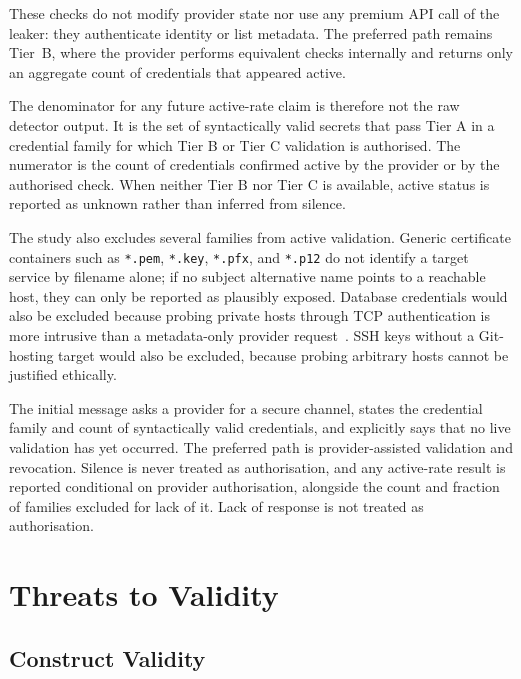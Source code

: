 These checks do not modify provider state nor use any premium API call of the leaker: they authenticate identity or list metadata.
The preferred path remains Tier~B, where the provider performs equivalent checks internally and returns only an aggregate count of credentials that appeared active.

The denominator for any future active-rate claim is therefore not the raw detector output.
It is the set of syntactically valid secrets that pass Tier A in a credential family for which Tier B or Tier C validation is authorised.
The numerator is the count of credentials confirmed active by the provider or by the authorised check.
When neither Tier B nor Tier C is available, active status is reported as unknown rather than inferred from silence.

The study also excludes several families from active validation.
Generic certificate containers such as \texttt{*.pem}, \texttt{*.key}, \texttt{*.pfx}, and \texttt{*.p12} do not identify a target service by filename alone; if no subject alternative name points to a reachable host, they can only be reported as plausibly exposed.
Database credentials would also be excluded because probing private hosts through TCP authentication is more intrusive than a metadata-only provider request~\cite{yadmani2025}.
SSH keys without a Git-hosting target would also be excluded, because probing arbitrary hosts cannot be justified ethically.

The initial message asks a provider for a secure channel, states the credential family and count of syntactically valid credentials, and explicitly says that no live validation has yet occurred.
The preferred path is provider-assisted validation and revocation.
Silence is never treated as authorisation, and any active-rate result is reported conditional on provider authorisation, alongside the count and fraction of families excluded for lack of it.
Lack of response is not treated as authorisation.

\section{Threats to Validity}
\label{sec:sec-validity}

\subsection{Construct Validity}
\label{subsec:sec-val-construct}

